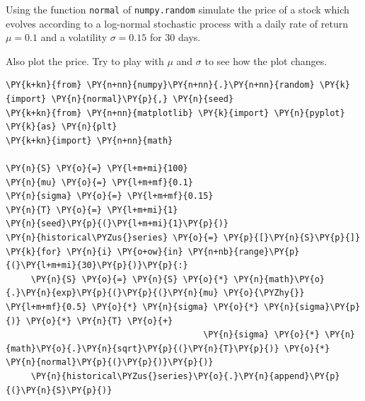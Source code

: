 \begin{Exercise}[title={(Stochastic Process Simulation)}]
Using the function \texttt{normal} of \texttt{numpy.random} simulate the price of a stock which evolves according to a log-normal stochastic process with a daily rate of return \(\mu=0.1\) and a volatility \(\sigma=0.15\) for 30 days.

Also plot the price. Try to play with \(\mu\) and \(\sigma\) to see how the plot changes.
\end{Exercise}
\vfill
\begin{Answer}
\begin{tcolorbox}[size=fbox, boxrule=1pt, colback=cellbackground, colframe=cellborder]
\begin{Verbatim}[commandchars=\\\{\}]
\PY{k+kn}{from} \PY{n+nn}{numpy}\PY{n+nn}{.}\PY{n+nn}{random} \PY{k}{import} \PY{n}{normal}\PY{p}{,} \PY{n}{seed}
\PY{k+kn}{from} \PY{n+nn}{matplotlib} \PY{k}{import} \PY{n}{pyplot} \PY{k}{as} \PY{n}{plt}
\PY{k+kn}{import} \PY{n+nn}{math}
 
\PY{n}{S} \PY{o}{=} \PY{l+m+mi}{100}
\PY{n}{mu} \PY{o}{=} \PY{l+m+mf}{0.1}
\PY{n}{sigma} \PY{o}{=} \PY{l+m+mf}{0.15}
\PY{n}{T} \PY{o}{=} \PY{l+m+mi}{1}
\PY{n}{seed}\PY{p}{(}\PY{l+m+mi}{1}\PY{p}{)}
\PY{n}{historical\PYZus{}series} \PY{o}{=} \PY{p}{[}\PY{n}{S}\PY{p}{]}
\PY{k}{for} \PY{n}{i} \PY{o+ow}{in} \PY{n+nb}{range}\PY{p}{(}\PY{l+m+mi}{30}\PY{p}{)}\PY{p}{:}
     \PY{n}{S} \PY{o}{=} \PY{n}{S} \PY{o}{*} \PY{n}{math}\PY{o}{.}\PY{n}{exp}\PY{p}{(}\PY{p}{(}\PY{n}{mu} \PY{o}{\PYZhy{}} \PY{l+m+mf}{0.5} \PY{o}{*} \PY{n}{sigma} \PY{o}{*} \PY{n}{sigma}\PY{p}{)} \PY{o}{*} \PY{n}{T} \PY{o}{+}
                                       \PY{n}{sigma} \PY{o}{*} \PY{n}{math}\PY{o}{.}\PY{n}{sqrt}\PY{p}{(}\PY{n}{T}\PY{p}{)} \PY{o}{*} \PY{n}{normal}\PY{p}{(}\PY{p}{)}\PY{p}{)}
     \PY{n}{historical\PYZus{}series}\PY{o}{.}\PY{n}{append}\PY{p}{(}\PY{n}{S}\PY{p}{)}
     

\end{Verbatim}
\end{tcolorbox}
\end{Answer}
